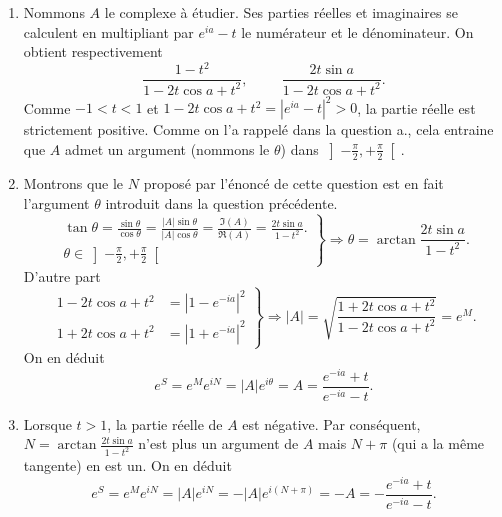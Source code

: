 \begin{enumerate}
\begin{enumerate}
\item Nommons $A$ le complexe à étudier. Ses parties r{\'e}elles et imaginaires se calculent en multipliant par $e^{ia}-t$ le num{\'e}rateur et le d{\'e}nominateur. On obtient respectivement
\begin{displaymath}
 \frac{1-t^{2}}{1-2t\cos a+t^{2}}, \hspace{1cm} \frac{2t\sin a}{1-2t\cos a+t^{2}}.
\end{displaymath}
Comme $ -1 < t < 1$ et $1-2t\cos a+t^{2} = \left| e^{ia} -t\right|^2>0$, la partie r{\'e}elle est strictement positive. Comme on l'a rappelé dans la question a., cela entraine que $A$ admet un argument (nommons le $\theta$) dans $\left] -\frac{\pi }{2},+\frac{\pi }{2}\right[$. 
\item Montrons que le $N$ proposé par l'énoncé de cette question est en fait l'argument $\theta$ introduit dans la question précédente.
\begin{displaymath}
\left. 
\begin{aligned}
 \tan \theta = \frac{\sin \theta}{\cos \theta} = \frac{|A|\sin \theta}{|A|\cos \theta}
 = \frac{\Im(A)}{\Re(A)} = \frac{2t\sin a}{1-t^{2}}.\\
 \theta \in \left] -\frac{\pi }{2},+\frac{\pi }{2}\right[
\end{aligned}
\right\rbrace \Rightarrow
\theta = \arctan \frac{2t\sin a}{1-t^{2}}.
\end{displaymath}
D'autre part
\begin{displaymath}
\left. 
\begin{aligned}
 1-2t\cos a+t^{2} &= \left| 1-e^{-ia}\right| ^{2}\\
 1+2t\cos a+t^{2} &= \left| 1+e^{-ia}\right| ^{2}
\end{aligned}
\right\rbrace \Rightarrow
 |A| = \sqrt{\frac{1+2t\cos a+t^{2}}{1 - 2t\cos a+t^{2}}} = e^M.
\end{displaymath}
On en déduit
\begin{displaymath}
 e^{S} = e^M e^{iN} = |A| e^{i\theta} = A = \frac{e^{-ia}+t}{e^{-ia}-t}.
\end{displaymath}

\item Lorsque $t>1$, la partie r{\'e}elle de $A$ est n{\'e}gative. Par cons{\'e}quent, $N = \arctan \frac{2t\sin a}{1-t^{2}}$ n'est plus un argument de $A$ mais $N+\pi$ (qui a la même tangente) en est un. On en d{\'e}duit
\begin{displaymath}
 e^{S} = e^M e^{iN} = |A| e^{i N} = - |A| e^{i(N+\pi)}= - A = - \frac{e^{-ia}+t}{e^{-ia}-t}.
\end{displaymath}
\end{enumerate}



\end{enumerate}
